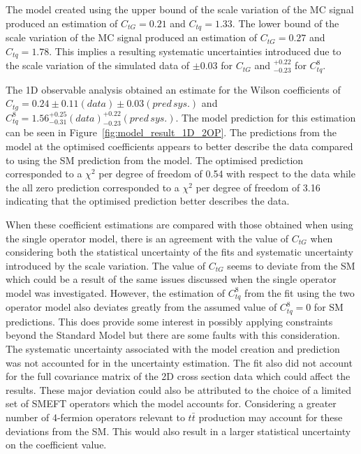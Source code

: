 \documentclass[a4paper,11pt]{article}
\begin{document}
The model created using the upper bound of the scale variation of the MC signal produced an estimation of $C_{tG}=0.21$ and $C_{tq}=1.33$.
The lower bound of the scale variation of the MC signal produced an estimation of $C_{tG}=0.27$ and $C_{tq}=1.78$.
This implies a resulting systematic uncertainties introduced due to the scale variation of the simulated data of $\pm 0.03$ for $C_{tG}$ and $^{+0.22}_{-0.23}$ for $C_{tq}^{8}$.

The 1D observable analysis obtained an estimate for the Wilson coefficients of $C_{tg} = 0.24 \pm 0.11 (data) \pm 0.03 (pred\,sys.)$ and $C_{tq}^{8}=1.56^{+0.25}_{-0.31} (data) ^{+0.22}_{-0.23} (pred\,sys.)$.
The model prediction for this estimation can be seen in Figure~\ref{fig:model_result_1D_2OP}.
The predictions from the model at the optimised coefficients appears to better describe the data compared to using the SM prediction from the model.
The optimised prediction corresponded to a $\chi^{2}$ per degree of freedom of 0.54 with respect to the data while the all zero prediction corresponded to a $\chi^{2}$ per degree of freedom of 3.16 indicating that the optimised prediction better describes the data.

When these coefficient estimations are compared with those obtained when using the single operator model, there is an agreement with the value of $C_{tG}$ when considering both the statistical uncertainty of the fits and systematic uncertainty introduced by the scale variation.
The value of $C_{tG}$ seems to deviate from the SM which could be a result of the same issues discussed when the single operator model was investigated.
However, the estimation of $C_{tq}^{8}$ from the fit using the two operator model also deviates greatly from the assumed value of $C_{tq}^{8}=0$ for SM predictions.
This does provide some interest in possibly applying constraints beyond the Standard Model but there are some faults with this consideration.
The systematic uncertainty associated with the model creation and prediction was not accounted for in the uncertainty estimation.
The fit also did not account for the full covariance matrix of the 2D cross section data which could affect the results.
These major deviation could also be attributed to the choice of a limited set of SMEFT operators which the model accounts for.
Considering a greater number of 4-fermion operators relevant to $t\bar{t}$ production may account for these deviations from the SM.
This would also result in a larger statistical uncertainty on the coefficient value.
\end{document}
